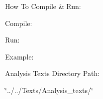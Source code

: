 How To Compile \& Run\+:

Compile\+: 
\begin{DoxyCode}{0}
\end{DoxyCode}


Run\+: 
\begin{DoxyCode}{0}
\end{DoxyCode}



\begin{DoxyItemize}
\item Example\+: 
\begin{DoxyCode}{0}
\end{DoxyCode}

\end{DoxyItemize}

Analysis Texts Directory Path\+:


\begin{DoxyItemize}
\item \char`\"{}../../\+Texts/\+Analysis\+\_\+texts/\char`\"{} 
\end{DoxyItemize}